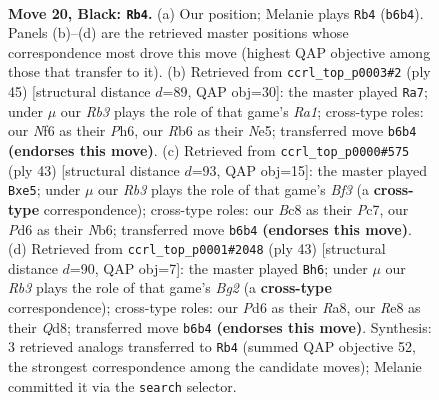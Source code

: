 \documentclass[11pt]{article}
\begin{document}
\clearpage

\begin{figure}[p]\centering
\begin{subfigure}{0.46\textwidth}\centering
\resizebox{\linewidth}{!}{%
\newchessgame
\chessboard[
  setfen={2bqrk2/Q1p2p1p/Prpp1n2/6N1/2P1P3/8/2P2PP1/R1B2RK1 b - - 2 20},
  showmover=false,
  pgfstyle=straightmove, color=movearrow, markmove={b6-b4}
]}
\caption{}
\end{subfigure}\hfill
\begin{subfigure}{0.46\textwidth}\centering
\resizebox{\linewidth}{!}{%
\newchessgame
\chessboard[
  setfen={r4r1k/5Pp1/pq1b3p/1p2n2B/3pQ3/1P6/P5PP/R1B2RK1 b - - 2 23},
  showmover=false,
  pgfstyle=straightmove, color=movearrow, markmove={a8-a7}
]}
\caption{}
\end{subfigure}
\\[4pt]
\begin{subfigure}{0.46\textwidth}\centering
\resizebox{\linewidth}{!}{%
\newchessgame
\chessboard[
  setfen={2q2r1k/1pp3p1/rn3b1p/4Pp2/P7/2NQP1P1/5P1P/1RB1R1K1 b - - 0 22},
  showmover=false,
  pgfstyle=straightmove, color=movearrow, markmove={f6-e5}
]}
\caption{}
\end{subfigure}\hfill
\begin{subfigure}{0.46\textwidth}\centering
\resizebox{\linewidth}{!}{%
\newchessgame
\chessboard[
  setfen={r2q1k1r/5pb1/3p2n1/1B1P1p2/2N1pP1p/8/PP4PP/1R2QRK1 b - f3 0 22},
  showmover=false,
  pgfstyle=straightmove, color=movearrow, markmove={g7-h6}
]}
\caption{}
\end{subfigure}
\caption{\textbf{Move 20, Black: \texttt{Rb4}.} (a) Our position; Melanie plays \texttt{Rb4} (\texttt{b6b4}). Panels (b)--(d) are the retrieved master positions whose correspondence most drove this move (highest QAP objective among those that transfer to it). (b) Retrieved from \texttt{ccrl\_top\_p0003\#2} (ply 45) [structural distance $d$=89, QAP obj=30]: the master played \texttt{Ra7}; under $\mu$ our \emph{Rb3} plays the role of that game's \emph{Ra1}; cross-type roles: our \emph{N}f6 as their \emph{P}h6, our \emph{R}b6 as their \emph{N}e5; transferred move \texttt{b6b4} \textbf{(endorses this move)}. (c) Retrieved from \texttt{ccrl\_top\_p0000\#575} (ply 43) [structural distance $d$=93, QAP obj=15]: the master played \texttt{Bxe5}; under $\mu$ our \emph{Rb3} plays the role of that game's \emph{Bf3} (a \textbf{cross-type} correspondence); cross-type roles: our \emph{B}c8 as their \emph{P}c7, our \emph{P}d6 as their \emph{N}b6; transferred move \texttt{b6b4} \textbf{(endorses this move)}. (d) Retrieved from \texttt{ccrl\_top\_p0001\#2048} (ply 43) [structural distance $d$=90, QAP obj=7]: the master played \texttt{Bh6}; under $\mu$ our \emph{Rb3} plays the role of that game's \emph{Bg2} (a \textbf{cross-type} correspondence); cross-type roles: our \emph{P}d6 as their \emph{R}a8, our \emph{R}e8 as their \emph{Q}d8; transferred move \texttt{b6b4} \textbf{(endorses this move)}. Synthesis: 3 retrieved analogs transferred to \texttt{Rb4} (summed QAP objective 52, the strongest correspondence among the candidate moves); Melanie committed it via the \texttt{search} selector.}
\label{fig:thought-m39}
\end{figure}
\end{document}
